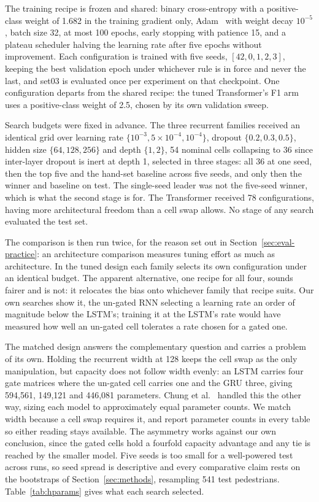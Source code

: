 \documentclass[mti,article,submit,moreauthors]{Definitions/mdpi}
\begin{document}
The training recipe is frozen and shared: binary cross-entropy with a positive-class weight of 1.682 in the training gradient only, Adam~\citep{kingma2015adam} with weight decay $10^{-5}$, batch size 32, at most 100 epochs, early stopping with patience 15, and a plateau scheduler halving the learning rate after five epochs without improvement. Each configuration is trained with five seeds, $[42, 0, 1, 2, 3]$, keeping the best validation epoch under whichever rule is in force and never the last, and set03 is evaluated once per experiment on that checkpoint. One configuration departs from the shared recipe: the tuned Transformer's F1 arm uses a positive-class weight of 2.5, chosen by its own validation sweep.

Search budgets were fixed in advance. The three recurrent families received an identical grid over learning rate $\{10^{-3}, 5\times10^{-4}, 10^{-4}\}$, dropout $\{0.2, 0.3, 0.5\}$, hidden size $\{64, 128, 256\}$ and depth $\{1, 2\}$, 54 nominal cells collapsing to 36 since inter-layer dropout is inert at depth 1, selected in three stages: all 36 at one seed, then the top five and the hand-set baseline across five seeds, and only then the winner and baseline on test. The single-seed leader was not the five-seed winner, which is what the second stage is for. The Transformer received 78 configurations, having more architectural freedom than a cell swap allows. No stage of any search evaluated the test set.

The comparison is then run twice, for the reason set out in Section~\ref{sec:eval-practice}: an architecture comparison measures tuning effort as much as architecture. In the tuned design each family selects its own configuration under an identical budget. The apparent alternative, one recipe for all four, sounds fairer and is not: it relocates the bias onto whichever family that recipe suits. Our own searches show it, the un-gated RNN selecting a learning rate an order of magnitude below the LSTM's; training it at the LSTM's rate would have measured how well an un-gated cell tolerates a rate chosen for a gated one.

The matched design answers the complementary question and carries a problem of its own. Holding the recurrent width at 128 keeps the cell swap as the only manipulation, but capacity does not follow width evenly: an LSTM carries four gate matrices where the un-gated cell carries one and the GRU three, giving 594,561, 149,121 and 446,081 parameters. Chung et al.~\citep{chung2014gru} handled this the other way, sizing each model to approximately equal parameter counts. We match width because a cell swap requires it, and report parameter counts in every table so either reading stays available. The asymmetry works against our own conclusion, since the gated cells hold a fourfold capacity advantage and any tie is reached by the smaller model. Five seeds is too small for a well-powered test across runs, so seed spread is descriptive and every comparative claim rests on the bootstraps of Section~\ref{sec:methods}, resampling 541 test pedestrians. Table~\ref{tab:hparams} gives what each search selected.
\end{document}
